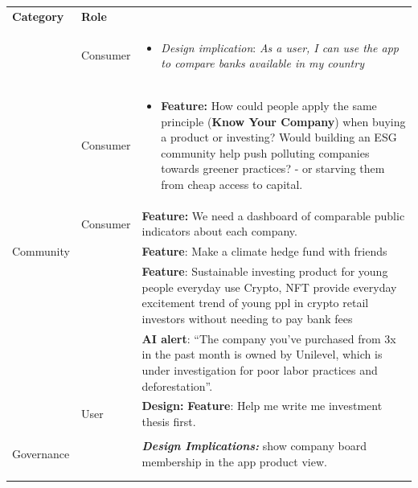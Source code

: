 \documentclass[
  letterpaper,
  DIV=11,
  numbers=noendperiod]{scrartcl}
\providecommand{\tightlist}{%
  \setlength{\itemsep}{0pt}\setlength{\parskip}{0pt}}\usepackage{longtable,booktabs,array}
\begin{document}
\begin{longtable}[]{@{}
  >{\raggedright\arraybackslash}p{}
  >{\raggedright\arraybackslash}p{}
  >{\raggedright\arraybackslash}p{}@{}}
\toprule\noalign{}
\endhead
\bottomrule\noalign{}
\endlastfoot
\textbf{Category} & \textbf{Role} & \\
& Consumer & \begin{minipage}[t]{\linewidth}\raggedright
\begin{itemize}
\tightlist
\item
  \emph{Design implication}: \emph{As a user, I can use the app to
  compare banks available in my country}
\end{itemize}
\end{minipage} \\
& Consumer & \begin{minipage}[t]{\linewidth}\raggedright
\begin{itemize}
\tightlist
\item
  \textbf{Feature:} How could people apply the same principle
  (\textbf{Know Your Company}) when buying a product or investing? Would
  building an ESG community help push polluting companies towards
  greener practices? - or starving them from cheap access to capital.
\end{itemize}
\end{minipage} \\
& Consumer & \textbf{Feature:} We need a dashboard of comparable public
indicators about each company. \\
Community & & \textbf{Feature}: Make a climate hedge fund with
friends \\
& & \textbf{Feature}: Sustainable investing product for young people
everyday use Crypto, NFT provide everyday excitement trend of young ppl
in crypto retail investors without needing to pay bank fees \\
& & \textbf{AI alert}: ``The company you've purchased from 3x in the
past month is owned by Unilevel, which is under investigation for poor
labor practices and deforestation''. \\
& User & \textbf{Design:} \textbf{Feature}: Help me write me investment
thesis first. \\
& & \\
Governance & & \textbf{\emph{Design Implications:}} show company board
membership in the app product view. \\
& & \\
& & \\
\end{longtable}
\end{document}
